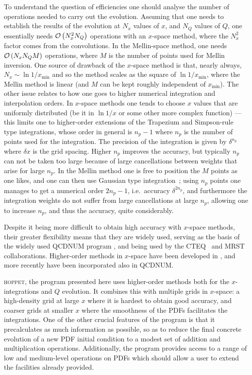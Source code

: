 \documentclass[12pt]{article}
\newcommand{\ie}{i.e.\ }
\newcommand{\hoppet}{\textsc{hoppet}\xspace}
\newcommand{\order}[1]{{\cal O}\left(#1\right)}
\begin{document}
To understand the question of efficiencies one should analyse the
number of operations needed to carry out the evolution. Assuming that
one needs to establish the results of the evolution at $N_x$ values of
$x$, and $N_Q$ values of $Q$, one essentially needs $\order{N_x^2
  N_Q}$ operations with an $x$-space method, where the $N_x^2$ factor
comes from the convolutions. In the Mellin-space method, one needs
$\order{N_x N_Q M}$ operations, where $M$ is the number of points used
for Mellin inversion. One source of drawback of the $x$-space method
is that, nearly always, $N_x \sim \ln 1/x_{\min}$ and so the method
scales as the square of $\ln 1/x_{\min}$, where the Mellin method is
linear (and $M$ can be kept roughly independent of $x_{\min}$). 
%
The other issue relates to how one goes to higher numerical
integration and interpolation orders.
%
In $x$-space methods one tends to choose $x$ values that are uniformly
distributed (be it in $\ln 1/x$ or some other more complex function)
--- this limits one to higher-order extensions of the Trapezium and
Simpson-rule type integrations, whose order in general is $n_p-1$
where $n_p$ is the number of points used for the integration. The
precision of the integration is given by $\delta^{n_p}$ where
$\delta x$ is the grid spacing. Higher $n_p$ improves the accuracy,
but typically $n_p$ can not be taken too large because of large
cancellations between weights that arise for large $n_p$.
%
In the Mellin method one is free to position the $M$ points as one
likes, and one can then use Gaussian type
integration~\cite{Kosower,Weinzierl:2002mv,Pegasus}; using $n_p$
points one manages to get a numerical order $2n_p-1$, \ie accuracy
$\delta^{2n_p}$, and furthermore the integration weights do not suffer
from large cancellations at large $n_p$, allowing one to increase
$n_p$, and thus the accuracy, quite considerably.

Despite it being more difficult to obtain high accuracy with $x$-space
methods, their greater flexibility means that they are widely used,
serving as the basis of the widely used QCDNUM program \cite{Botje},
and being used by the CTEQ~\cite{CTEQ} and MRST~\cite{MRST}
collaborations. Higher-order methods in $x$-space have been developed
in \cite{Schoeffel:1998tz,Pascaud:2001bi,coriano,GuzziThesis}, and
more recently have been incorporated also in QCDNUM.

\hoppet, the program presented here uses higher-order methods both for
the $x$-integrations and $Q$ evolution. It combines this with multiple
grids in $x$-space: a high-density grid at large $x$ where it is
hardest to obtain good accuracy, and coarser grids at smaller $x$
where the smoothness of the PDFs facilitates the integrations. One of
the other crucial features of the program is that it precalculates as
much information as possible, so as to reduce the final concrete
evolution of a new PDF initial condition to a modest set of addition
and multiplication operations. Additionally, the program provides
access to a range of low and medium-level operations on PDFs which
should allow a user to extend the facilities already provided.
\end{document}
